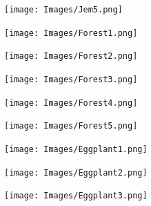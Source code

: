 \documentclass[11pt]{beamer}
\begin{document}
\begin{frame}{}
    \centering \texttt{[image: Images/Jem5.png]}
\end{frame}

\begin{frame}{}
    \centering \texttt{[image: Images/Forest1.png]}
\end{frame}

\begin{frame}{}
    \centering \texttt{[image: Images/Forest2.png]}
\end{frame}

\begin{frame}{}
    \centering \texttt{[image: Images/Forest3.png]}
\end{frame}

\begin{frame}{}
    \centering \texttt{[image: Images/Forest4.png]}
\end{frame}

\begin{frame}{}
    \centering \texttt{[image: Images/Forest5.png]}
\end{frame}

\begin{frame}{}
    \centering \texttt{[image: Images/Eggplant1.png]}
\end{frame}

\begin{frame}{}
    \centering \texttt{[image: Images/Eggplant2.png]}
\end{frame}

\begin{frame}{}
    \centering \texttt{[image: Images/Eggplant3.png]}
\end{frame}
\end{document}
